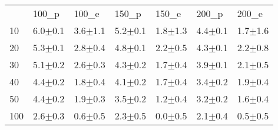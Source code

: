 \begin{tabular}{lllllll}
 & 100_p & 100_e & 150_p & 150_e & 200_p & 200_e \\
10 & {\cellcolor[HTML]{FFFFFF}} \color[HTML]{000000} 6.0$\pm$0.1 & {\cellcolor[HTML]{C3C3C3}} \color[HTML]{000000} 3.6$\pm$1.1 & {\cellcolor[HTML]{FAFAFA}} \color[HTML]{000000} 5.2$\pm$0.1 & {\cellcolor[HTML]{AEAEAE}} \color[HTML]{000000} 1.8$\pm$1.3 & {\cellcolor[HTML]{F7F7F7}} \color[HTML]{000000} 4.4$\pm$0.1 & {\cellcolor[HTML]{A7A7A7}} \color[HTML]{F1F1F1} 1.7$\pm$1.6 \\
20 & {\cellcolor[HTML]{FCFCFC}} \color[HTML]{000000} 5.3$\pm$0.1 & {\cellcolor[HTML]{D6D6D6}} \color[HTML]{000000} 2.8$\pm$0.4 & {\cellcolor[HTML]{F5F5F5}} \color[HTML]{000000} 4.8$\pm$0.1 & {\cellcolor[HTML]{CBCBCB}} \color[HTML]{000000} 2.2$\pm$0.5 & {\cellcolor[HTML]{F5F5F5}} \color[HTML]{000000} 4.3$\pm$0.1 & {\cellcolor[HTML]{C0C0C0}} \color[HTML]{000000} 2.2$\pm$0.8 \\
30 & {\cellcolor[HTML]{F6F6F6}} \color[HTML]{000000} 5.1$\pm$0.2 & {\cellcolor[HTML]{DADADA}} \color[HTML]{000000} 2.6$\pm$0.3 & {\cellcolor[HTML]{F0F0F0}} \color[HTML]{000000} 4.3$\pm$0.2 & {\cellcolor[HTML]{C8C8C8}} \color[HTML]{000000} 1.7$\pm$0.4 & {\cellcolor[HTML]{F5F5F5}} \color[HTML]{000000} 3.9$\pm$0.1 & {\cellcolor[HTML]{CBCBCB}} \color[HTML]{000000} 2.1$\pm$0.5 \\
40 & {\cellcolor[HTML]{F1F1F1}} \color[HTML]{000000} 4.4$\pm$0.2 & {\cellcolor[HTML]{CFCFCF}} \color[HTML]{000000} 1.8$\pm$0.4 & {\cellcolor[HTML]{EEEEEE}} \color[HTML]{000000} 4.1$\pm$0.2 & {\cellcolor[HTML]{CCCCCC}} \color[HTML]{000000} 1.7$\pm$0.4 & {\cellcolor[HTML]{F0F0F0}} \color[HTML]{000000} 3.4$\pm$0.2 & {\cellcolor[HTML]{CBCBCB}} \color[HTML]{000000} 1.9$\pm$0.4 \\
50 & {\cellcolor[HTML]{F3F3F3}} \color[HTML]{000000} 4.4$\pm$0.2 & {\cellcolor[HTML]{D1D1D1}} \color[HTML]{000000} 1.9$\pm$0.3 & {\cellcolor[HTML]{E7E7E7}} \color[HTML]{000000} 3.5$\pm$0.2 & {\cellcolor[HTML]{BFBFBF}} \color[HTML]{000000} 1.2$\pm$0.4 & {\cellcolor[HTML]{E9E9E9}} \color[HTML]{000000} 3.2$\pm$0.2 & {\cellcolor[HTML]{C9C9C9}} \color[HTML]{000000} 1.6$\pm$0.4 \\
100 & {\cellcolor[HTML]{DCDCDC}} \color[HTML]{000000} 2.6$\pm$0.3 & {\cellcolor[HTML]{AAAAAA}} \color[HTML]{F1F1F1} 0.6$\pm$0.5 & {\cellcolor[HTML]{CCCCCC}} \color[HTML]{000000} 2.3$\pm$0.5 & {\cellcolor[HTML]{959595}} \color[HTML]{F1F1F1} 0.0$\pm$0.5 & {\cellcolor[HTML]{D3D3D3}} \color[HTML]{000000} 2.1$\pm$0.4 & {\cellcolor[HTML]{A5A5A5}} \color[HTML]{F1F1F1} 0.5$\pm$0.5 \\

\end{tabular}
